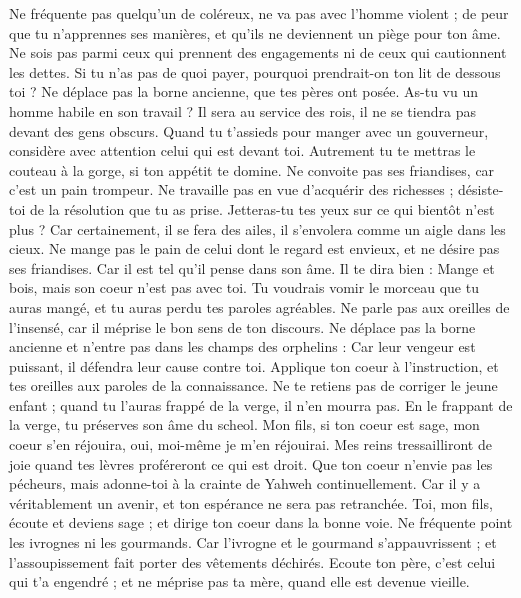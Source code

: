 \begin{multicols}{2}
Ne fréquente pas quelqu’un de coléreux, ne va pas avec l'homme violent ;
de peur que tu n’apprennes ses manières, et qu’ils ne deviennent un piège pour ton âme.
Ne sois pas parmi ceux qui prennent des engagements ni de ceux qui cautionnent les dettes.
Si tu n'as pas de quoi payer, pourquoi prendrait-on ton lit de dessous toi ?
Ne déplace pas la borne ancienne, que tes pères ont posée.
As-tu vu un homme habile en son travail ? Il sera au service des rois, il ne se tiendra pas devant des gens obscurs.
\VerseOne{}Quand tu t’assieds pour manger avec un gouverneur, considère avec attention celui qui est devant toi.
Autrement tu te mettras le couteau à la gorge, si ton appétit te domine.
Ne convoite pas ses friandises, car c'est un pain trompeur.
Ne travaille pas en vue d’acquérir des richesses ; désiste-toi de la résolution que tu as prise.
Jetteras-tu tes yeux sur ce qui bientôt n'est plus ? Car certainement, il se fera des ailes, il s'envolera comme un aigle dans les cieux.
Ne mange pas le pain de celui dont le regard est envieux, et ne désire pas ses friandises.
Car il est tel qu'il pense dans son âme. Il te dira bien : Mange et bois, mais son coeur n'est pas avec toi.
Tu voudrais vomir le morceau que tu auras mangé, et tu auras perdu tes paroles agréables.
Ne parle pas aux oreilles de l’insensé, car il méprise le bon sens de ton discours.
Ne déplace pas la borne ancienne et n'entre pas dans les champs des orphelins :
Car leur vengeur est puissant, il défendra leur cause contre toi.
Applique ton coeur à l'instruction, et tes oreilles aux paroles de la connaissance.
Ne te retiens pas de corriger le jeune enfant ; quand tu l'auras frappé de la verge, il n'en mourra pas.
En le frappant de la verge, tu préserves son âme du scheol.
Mon fils, si ton coeur est sage, mon coeur s'en réjouira, oui, moi-même je m’en réjouirai.
Mes reins tressailliront de joie quand tes lèvres proféreront ce qui est droit.
Que ton coeur n'envie pas les pécheurs, mais adonne-toi à la crainte de Yahweh continuellement.
Car il y a véritablement un avenir, et ton espérance ne sera pas retranchée.
Toi, mon fils, écoute et deviens sage ; et dirige ton coeur dans la bonne voie.
Ne fréquente point les ivrognes ni les gourmands.
Car l'ivrogne et le gourmand s’appauvrissent ; et l’assoupissement fait porter des vêtements déchirés.
Ecoute ton père, c’est celui qui t'a engendré ; et ne méprise pas ta mère, quand elle est devenue vieille.

\end{multicols}
